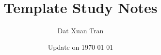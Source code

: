 \documentclass{../mathbook}
\begin{document}
\title{\bf \huge {{Template}} Study Notes}
\author{Dat Xuan Tran}
\date{Update on \today}
\maketitle
\setcounter{tocdepth}{2}
\setcounter{minitocdepth}{1}



\begin{multicols}{2}
    \dominitoc%
    \adjustmtc[2]%
    \tableofcontents
    \label{toc-contents}
\end{multicols}

	\listoffigures
	\listoftables
\begin{multicols}{2}
	\listoftheorems[ignoreall, show={theorem}]
\end{multicols}

	\renewcommand{\listtheoremname}{List of Definitions}
\begin{multicols}{2}
	\listoftheorems[ignoreall, show={definition}]
\end{multicols}

	\printglossary





\begin{appendices}
\end{appendices}

\backmatter

\printbibliography[heading=bibintoc]
\printindex
\end{document}
